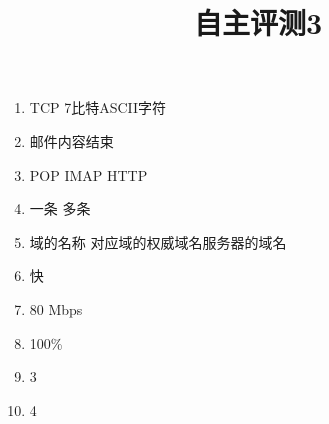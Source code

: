 \documentclass[11pt]{article}
\title{自主评测3}
\date{}
\author{}
\begin{document}
\maketitle

\begin{enumerate}
    \item TCP  \quad 7比特ASCII字符
    \item 邮件内容结束
    \item POP \quad IMAP \quad HTTP
    \item 一条 \quad 多条
    \item 域的名称 \quad 对应域的权威域名服务器的域名
    \item 快
    \item 80 Mbps %
    \item 100\%
    \item 3
    \item 4
\end{enumerate}
\end{document}
